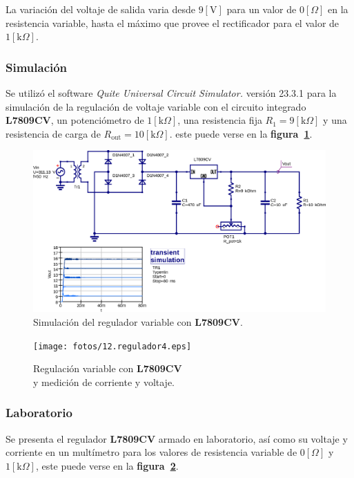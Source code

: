 La variación del voltaje de salida varia desde $9[\text{V}]$ para un valor de
$0[\Omega]$ en la resistencia variable, hasta el máximo que provee el
rectificador para el valor de $1[\text{k}\Omega]$.

\subsubsection{Simulación}
Se utilizó el software \emph{Quite Universal Circuit Simulator.} versión 23.3.1
para la simulación de la regulación de voltaje variable con el circuito
integrado \textbf{L7809CV}, un potenciómetro de $1[\text{k}\Omega]$, una
resistencia fija $R_1 = 9[\text{k}\Omega]$ y una resistencia de carga de
$R_{\text{out}} = 10[\text{k}\Omega]$. este puede verse en la
\textbf{figura~\ref{simulacion12}}.

\begin{figure}[!h]
\centering
\includegraphics[scale=0.75]{simulacion/12.regulador4.eps}
\caption{Simulación del regulador variable con \textbf{L7809CV}.}
\label{simulacion12}
\end{figure}

\begin{figure}[!h]
\centering
\texttt{[image: fotos/12.regulador4.eps]}
\caption{Regulación variable con \textbf{L7809CV} \\
y medición de corriente y voltaje.}
\label{laboratorio14}
\end{figure}

\subsubsection{Laboratorio}
Se presenta el regulador \textbf{L7809CV} armado en laboratorio, así como su
voltaje y corriente en un multímetro para los valores de resistencia variable de
$0[\Omega]$ y $1[\text{k}\Omega]$, este puede verse en la
\textbf{figura~\ref{laboratorio14}}.

